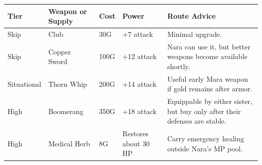 \documentclass[
  american,
  10pt,
  letterpaper,
  oneside,
  open=any]{scrreprt}
\newcounter{none} %
\newenvironment{guidetable}{%
  \small\setstretch{1.0}%
  \setlength{\tabcolsep}{4pt}%
  \setlength{\LTpre}{8pt}\setlength{\LTpost}{10pt}%
  \renewcommand{\arraystretch}{1.16}%
}{ }
\begin{document}
\begin{guidetable}

{\def\LTcaptype{none} %
\begin{longtable}[]{@{}
  >{\raggedright\arraybackslash}p{}
  >{\raggedright\arraybackslash}p{}
  >{\raggedleft\arraybackslash}p{}
  >{\raggedleft\arraybackslash}p{}
  >{\raggedright\arraybackslash}p{}@{}}
\toprule\noalign{}
\begin{minipage}[b]{\linewidth}\raggedright
\color{GuideGreen}\bfseries Tier
\end{minipage} & \begin{minipage}[b]{\linewidth}\raggedright
\color{GuideGreen}\bfseries Weapon or Supply
\end{minipage} & \begin{minipage}[b]{\linewidth}\raggedleft
\color{GuideGreen}\bfseries Cost
\end{minipage} & \begin{minipage}[b]{\linewidth}\raggedleft
\color{GuideGreen}\bfseries Power
\end{minipage} & \begin{minipage}[b]{\linewidth}\raggedright
\color{GuideGreen}\bfseries Route Advice
\end{minipage} \\
\midrule\noalign{}
\endhead
\bottomrule\noalign{}
\endlastfoot
Skip & Club & 30G & +7 attack & Minimal upgrade. \\
Skip & Copper Sword & 100G & +12 attack & Nara can use it, but better
weapons become available shortly. \\
Situational & Thorn Whip & 200G & +14 attack & Useful early Mara weapon
if gold remains after armor. \\
High & Boomerang & 350G & +18 attack & Equippable by either sister, but
buy only after their defenses are stable. \\
High & Medical Herb & 8G & Restores about 30 HP & Carry emergency
healing outside Nara's MP pool. \\
\end{longtable}
}

\end{guidetable}
\end{document}

